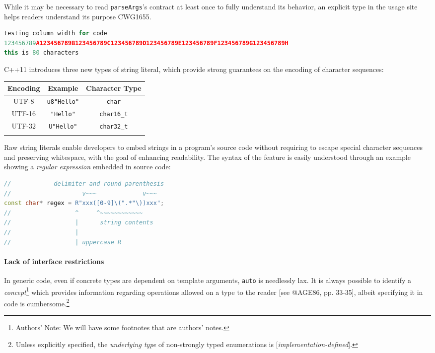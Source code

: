 \documentclass[twoside,10pt,letterpaper,usenames]{newstyle-PearsonGeneric-7-38}
\newcommand{\passthrough}[1]{\texttt{#1}}
\let\Begin\begin
\let\End\end
\begin{document}
While it may be necessary to read \passthrough{\lstinline!parseArgs!}'s
contract at least once to fully understand its behavior, an explicit
type in the usage site helps readers understand its purpose CWG1655.

\begin{lstlisting}[language=C++, caption={missing caption}, label={testlabel}, frame=tb]
testing column width for code
123456789A123456789B123456789C123456789D123456789E123456789F123456789G123456789H
this is 80 characters
\end{lstlisting}
    

C++11 introduces three new types of string literal, which provide strong
guarantees on the encoding of character sequences:

\Begin{center}
{\small\Begin{tabular}{c|c|c}\thickhline
\rowcolor[gray]{.9}\textbf{\textsf Encoding} & \textbf{\textsf Example} & \textbf{\textsf Character Type} \\ \hline
UTF-8 & \texttt{u8"Hello"} &
\texttt{char} \\ \hline UTF-16 &
\texttt{"Hello"} & \texttt{char16\_t}
\\ \hline UTF-32 & \texttt{U"Hello"} &
\texttt{char32\_t} \\
\thickhline
\End{tabular}}
\End{center}

Raw string literals enable developers to embed strings in a program's
source code without requiring to escape special character sequences and
preserving whitespace, with the goal of enhancing readability. The
syntax of the feature is easily understood through an example showing a
\emph{regular expression} embedded in source code:

\begin{lstlisting}[language=C++, caption={missing caption}, label={testlabel}, frame=tb]
//            delimiter and round parenthesis
//                    v~~~             v~~~
const char* regex = R"xxx([0-9]\(".*"\))xxx";
//                  ^     ^~~~~~~~~~~~~
//                  |      string contents
//                  |
//                  | uppercase R
\end{lstlisting}
    

\paragraph[Lack of interface restrictions]{Lack of interface restrictions}\label{lack-of-interface-restrictions}

In generic code, even if concrete types are dependent on template
arguments, \passthrough{\lstinline!auto!} is needlessly lax. It is
always possible to identify a \emph{concept}{\cprotect\footnote{Authors'
  Note: We will have some footnotes that are authors' notes.}} which
provides information regarding operations allowed on a type to the
reader {[}see @AGE86, pp. 33-35{]}, albeit specifying it in code is
cumbersome.{\cprotect\footnote{Unless explicitly specified, the
  \emph{underlying type} of non-strongly typed enumerations is
  {[}\emph{implementation-defined}{]}.}}
\end{document}
